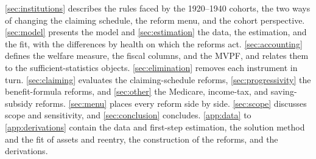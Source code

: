 \autoref{sec:institutions} describes the rules faced by the 1920--1940 cohorts, the two ways of changing the claiming schedule, the reform menu, and the cohort perspective.
\autoref{sec:model} presents the model and \autoref{sec:estimation} the data, the estimation, and the fit, with the differences by health on which the reforms act. \autoref{sec:accounting} defines the welfare measure, the fiscal columns, and the MVPF, and relates them to the sufficient-statistics objects. \autoref{sec:elimination} removes each instrument in turn. \autoref{sec:claiming} evaluates the claiming-schedule reforms, \autoref{sec:progressivity} the benefit-formula reforms, and \autoref{sec:other} the Medicare, income-tax, and saving-subsidy reforms. \autoref{sec:menu} places every reform side by side. \autoref{sec:scope} discusses scope and sensitivity, and \autoref{sec:conclusion} concludes. \autoref{app:data} to \autoref{app:derivations} contain the data and first-step estimation, the solution method and the fit of assets and reentry, the construction of the reforms, and the derivations.
